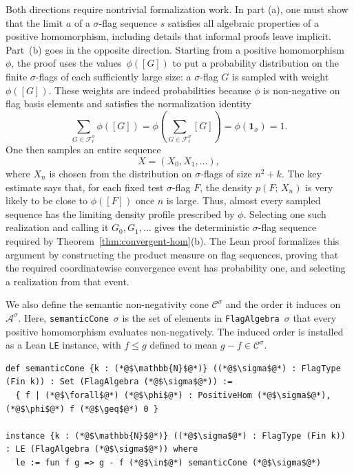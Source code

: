 \documentclass{article}
\newcommand{\den}[2]{p(#1;\,#2)}
\newcommand{\lean}[1]{\texttt{#1}}
\begin{document}
Both directions require nontrivial formalization work.  In part (a), one must
show that the limit \(a\) of a \(\sigma\)-flag sequence \(s\) satisfies all algebraic
properties of a positive homomorphism, including details that informal proofs
leave implicit.  Part~(b) goes in the opposite direction.  Starting from a
positive homomorphism~\(\phi\), the proof uses the values~\(\phi([G])\) to put a
probability distribution on the finite \(\sigma\)-flags of each sufficiently
large size: a \(\sigma\)-flag \(G\) is sampled with weight \(\phi([G])\).  These weights are
indeed probabilities because \(\phi\) is non-negative on flag basis elements and satisfies the normalization
identity
\[
  \sum_{G\in\mathcal{F}^{\sigma}_{\ell}} \phi([G])
  =
  \phi\left(\sum_{G\in\mathcal{F}^{\sigma}_{\ell}} [G]\right)
  =
  \phi(\mathbf{1}_\sigma)
  =
  1.
\]
One then samples an entire sequence
\[
  X=(X_0,X_1,\ldots),
\]
where \(X_n\) is chosen from the distribution on \(\sigma\)-flags of size \(n^2+k\).
The key estimate says that, for each fixed test \(\sigma\)-flag \(F\), the density
\(\den{F}{X_n}\) is very likely to be close to \(\phi([F])\) once \(n\) is large.
Thus, almost every sampled sequence has the limiting density profile prescribed
by \(\phi\).  Selecting one such realization and calling it
\(G_0,G_1,\ldots\) gives the deterministic \(\sigma\)-flag sequence required by
Theorem~\ref{thm:convergent-hom}(b).  The Lean proof formalizes this argument
by constructing the product measure on flag sequences, proving that the
required coordinatewise convergence event has probability one, and selecting
a realization from that event.

We also define the semantic non-negativity cone $\mathcal{C}^\sigma$
and the order it induces on $\mathcal{A}^\sigma$.
Here, 
\lean{semanticCone}~$\sigma$ is the set of elements in
\lean{FlagAlgebra}~$\sigma$ that every positive homomorphism
evaluates non-negatively.  The induced order is installed as a Lean
\lean{LE} instance, with $f \leq g$ defined to mean
$g - f \in \mathcal{C}^\sigma$.
\begin{lstlisting}
def semanticCone {k : (*@$\mathbb{N}$@*)} ((*@$\sigma$@*) : FlagType (Fin k)) : Set (FlagAlgebra (*@$\sigma$@*)) :=
  { f | (*@$\forall$@*) (*@$\phi$@*) : PositiveHom (*@$\sigma$@*), (*@$\phi$@*) f (*@$\geq$@*) 0 }

instance {k : (*@$\mathbb{N}$@*)} ((*@$\sigma$@*) : FlagType (Fin k)) : LE (FlagAlgebra (*@$\sigma$@*)) where
  le := fun f g => g - f (*@$\in$@*) semanticCone (*@$\sigma$@*)
\end{lstlisting}
\end{document}

